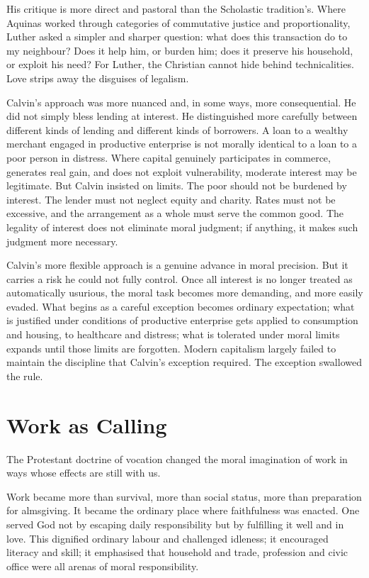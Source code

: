 \documentclass[11pt,a4paper,oneside]{book}
\begin{document}
His critique is more direct and pastoral than the Scholastic tradition's. Where Aquinas worked through categories of commutative justice and proportionality, Luther asked a simpler and sharper question: what does this transaction do to my neighbour? Does it help him, or burden him; does it preserve his household, or exploit his need? For Luther, the Christian cannot hide behind technicalities. Love strips away the disguises of legalism.

Calvin's approach was more nuanced and, in some ways, more consequential. He did not simply bless lending at interest. He distinguished more carefully between different kinds of lending and different kinds of borrowers. A loan to a wealthy merchant engaged in productive enterprise is not morally identical to a loan to a poor person in distress. Where capital genuinely participates in commerce, generates real gain, and does not exploit vulnerability, moderate interest may be legitimate. But Calvin insisted on limits. The poor should not be burdened by interest. The lender must not neglect equity and charity. Rates must not be excessive, and the arrangement as a whole must serve the common good. The legality of interest does not eliminate moral judgment; if anything, it makes such judgment more necessary.

Calvin's more flexible approach is a genuine advance in moral precision. But it carries a risk he could not fully control. Once all interest is no longer treated as automatically usurious, the moral task becomes more demanding, and more easily evaded. What begins as a careful exception becomes ordinary expectation; what is justified under conditions of productive enterprise gets applied to consumption and housing, to healthcare and distress; what is tolerated under moral limits expands until those limits are forgotten. Modern capitalism largely failed to maintain the discipline that Calvin's exception required. The exception swallowed the rule.

\section*{Work as Calling}

The Protestant doctrine of vocation changed the moral imagination of work in ways whose effects are still with us.

Work became more than survival, more than social status, more than preparation for almsgiving. It became the ordinary place where faithfulness was enacted. One served God not by escaping daily responsibility but by fulfilling it well and in love. This dignified ordinary labour and challenged idleness; it encouraged literacy and skill; it emphasised that household and trade, profession and civic office were all arenas of moral responsibility.
\end{document}
